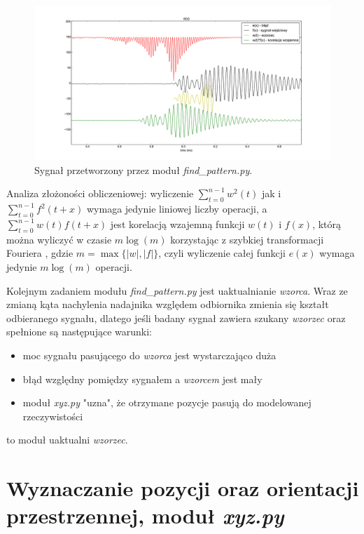 \begin{figure}[h!]
    \centering
    \includegraphics[width=1.15\textwidth, trim= 47mm 0mm 0mm 0mm,clip]{blad_korel}
    \caption{Sygnał przetworzony przez moduł \textit{find\_pattern.py}.}
    \label{fig:blad_korel}
\end{figure}
 
 
 Analiza złożoności obliczeniowej: wyliczenie $ \sum\limits_{t=0}^{n-1}  w^2(t) $ 
jak i $\sum\limits_{t=0}^{n-1} f^2(t+x)$ wymaga jedynie liniowej liczby operacji, a 
 $\sum\limits_{t=0}^{n-1}  w(t) f(t+x) $ jest korelacją wzajemną funkcji $w(t)$ i $f(x)$, którą
 można wyliczyć w czasie $m \log(m)$ korzystając z szybkiej transformacji Fouriera \cite{bib:FFT_correlation},
 gdzie $m = \max \{|w|, |f| \}$, czyli wyliczenie całej funkcji $e(x)$ wymaga jedynie $m \log(m)$ operacji.

 
 Kolejnym zadaniem modułu \textit{find\_pattern.py} jest uaktualnianie \textit{wzorca}.
 Wraz ze zmianą kąta nachylenia nadajnika względem odbiornika zmienia się kształt odbieranego sygnału,
 dlatego jeśli badany sygnał zawiera szukany \textit{wzorzec} oraz spełnione są następujące warunki:
 \begin{itemize}
  \item moc sygnału pasującego do \textit{wzorca} jest wystarczająco duża
  \item błąd względny pomiędzy sygnałem a \textit{wzorcem} jest mały
  \item moduł \textit{xyz.py} "uzna", że otrzymane pozycje pasują do modelowanej rzeczywistości
 \end{itemize}
to moduł uaktualni \textit{wzorzec}.
  
 
\section{Wyznaczanie pozycji oraz orientacji przestrzennej, moduł \textit{xyz.py}}

